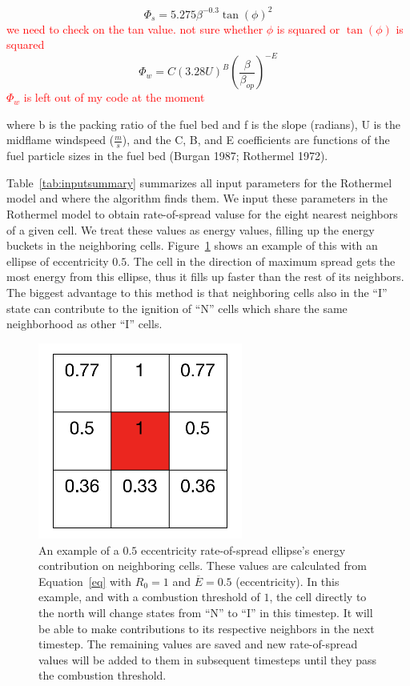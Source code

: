 \documentclass{article}
\newcommand{\note}[1]{\textcolor{red}{#1}}
\begin{document}
\begin{equation}
\Phi_s = 5.275\beta^{-0.3}\tan(\phi)^2
\end{equation}
\note{we need to check on the tan value. not sure whether $\phi$ is squared or $\tan(\phi)$ is squared}
\begin{equation}
\Phi_w = C(3.28U)^B(\frac{\beta}{\beta_{op}})^{-E}
\end{equation}
\note{$\Phi_w$ is left out of my code at the moment}

where b is the packing ratio of the fuel bed and f is the slope (radians), U is the midflame windspeed ($\frac{m}{s}$), and the C, B, and E coefficients are functions of the fuel particle sizes in the fuel bed \cite{}(Burgan 1987; Rothermel 1972).

Table~\ref{tab:inputsummary} summarizes all input parameters for the Rothermel model and where the algorithm finds them. We input these parameters in the Rothermel model to obtain rate-of-spread valuse for the eight nearest neighbors of a given cell. We treat these values as energy values, filling up the energy buckets in the neighboring cells. Figure~\ref{fig:buckets} shows an example of this with an ellipse of eccentricity $0.5$. The cell in the direction of maximum spread gets the most energy from this ellipse, thus it fills up faster than the rest of its neighbors. The biggest advantage to this method is that neighboring cells also in the ``I'' state can contribute to the ignition of ``N'' cells which share the same neighborhood as other ``I'' cells. 

\begin{figure}
\centering
\includegraphics[width=0.6\textwidth]{fire_bucket_ex.png}
\caption{An example of a $0.5$ eccentricity rate-of-spread ellipse's energy contribution on neighboring cells. These values are calculated from Equation~\ref{eq} with $R_0 = 1$ and $\overline{E} = 0.5$ (eccentricity). In this example, and with a combustion threshold of $1$, the cell directly to the north will change states from ``N'' to ``I'' in this timestep. It will be able to make contributions to its respective neighbors in the next timestep. The remaining values are saved and new rate-of-spread values will be added to them in subsequent timesteps until they pass the combustion threshold.\label{fig:buckets}}
\end{figure}
\end{document}
